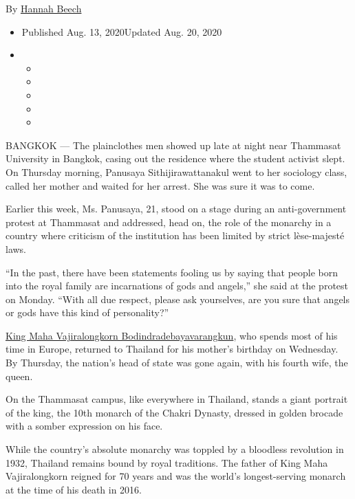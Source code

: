 By \href{https://www.nytimes3xbfgragh.onion/by/hannah-beech}{Hannah
Beech}

\begin{itemize}
\item
  Published Aug. 13, 2020Updated Aug. 20, 2020
\item
  \begin{itemize}
  \item
  \item
  \item
  \item
  \item
  \end{itemize}
\end{itemize}

BANGKOK --- The plainclothes men showed up late at night near Thammasat
University in Bangkok, casing out the residence where the student
activist slept. On Thursday morning, Panusaya Sithijirawattanakul went
to her sociology class, called her mother and waited for her arrest. She
was sure it was to come.

Earlier this week, Ms. Panusaya, 21, stood on a stage during an
anti-government protest at Thammasat and addressed, head on, the role of
the monarchy in a country where criticism of the institution has been
limited by strict lèse-majesté laws.

``In the past, there have been statements fooling us by saying that
people born into the royal family are incarnations of gods and angels,''
she said at the protest on Monday. ``With all due respect, please ask
yourselves, are you sure that angels or gods have this kind of
personality?''

\href{https://www.nytimes3xbfgragh.onion/2019/11/06/world/asia/thailand-king-consort-wives.html}{King
Maha Vajiralongkorn Bodindradebayavarangkun}, who spends most of his
time in Europe, returned to Thailand for his mother's birthday on
Wednesday. By Thursday, the nation's head of state was gone again, with
his fourth wife, the queen.

On the Thammasat campus, like everywhere in Thailand, stands a giant
portrait of the king, the 10th monarch of the Chakri Dynasty, dressed in
golden brocade with a somber expression on his face.

While the country's absolute monarchy was toppled by a bloodless
revolution in 1932, Thailand remains bound by royal traditions. The
father of King Maha Vajiralongkorn reigned for 70 years and was the
world's longest-serving monarch at the time of his death in 2016.

